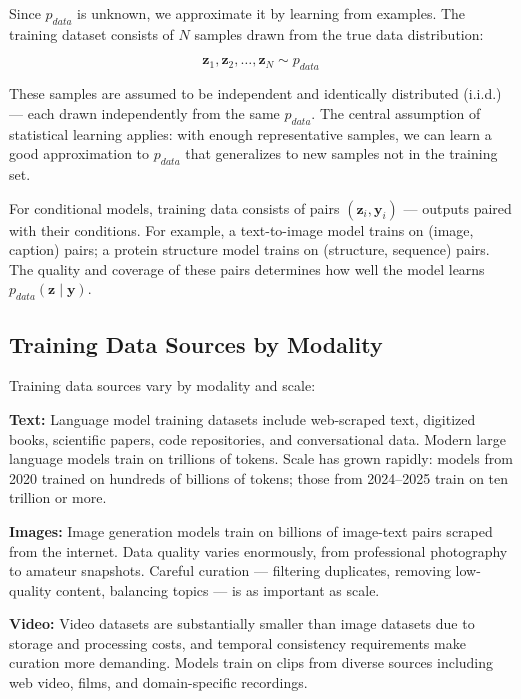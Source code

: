 \documentclass{book}
\begin{document}
Since $p_{data}$ is unknown, we approximate it by learning from examples. The
training dataset consists of $N$ samples drawn from the true data distribution:

\begin{equation}
\mathbf{z}_1, \mathbf{z}_2, \ldots, \mathbf{z}_N \sim p_{data}
\end{equation}

These samples are assumed to be independent and identically distributed
(i.i.d.) --- each drawn independently from the same $p_{data}$. The central
assumption of statistical learning applies: with enough representative samples,
we can learn a good approximation to $p_{data}$ that generalizes to new samples
not in the training set.

For conditional models, training data consists of pairs $(\mathbf{z}_i,
\mathbf{y}_i)$ --- outputs paired with their conditions. For example, a
text-to-image model trains on (image, caption) pairs; a protein structure model
trains on (structure, sequence) pairs. The quality and coverage of these pairs
determines how well the model learns $p_{data}(\mathbf{z} \mid \mathbf{y})$.

\subsection{Training Data Sources by Modality}

Training data sources vary by modality and scale:

\textbf{Text:} Language model training datasets include web-scraped text,
digitized books, scientific papers, code repositories, and conversational data.
Modern large language models train on trillions of tokens. Scale has grown
rapidly: models from 2020 trained on hundreds of billions of tokens; those from
2024--2025 train on ten trillion or more.

\textbf{Images:} Image generation models train on billions of image-text pairs
scraped from the internet. Data quality varies enormously, from professional
photography to amateur snapshots. Careful curation --- filtering duplicates,
removing low-quality content, balancing topics --- is as important as scale.

\textbf{Video:} Video datasets are substantially smaller than image datasets due
to storage and processing costs, and temporal consistency requirements make
curation more demanding. Models train on clips from diverse sources including
web video, films, and domain-specific recordings.
\end{document}
